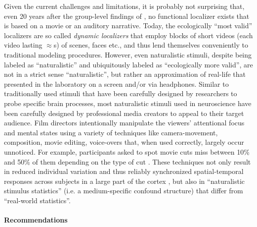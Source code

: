 %
Given the current challenges and limitations, it is probably not surprising
that, even 20 years after the group-level findings of
\citet{bartels2004mapping}, no functional localizer exists that is based on a
movie or an auditory narrative.
%
Today, the ecologically ``most valid'' localizers are so called \textit{dynamic
localizers} \citep{pitcher2011differential, fox2009defining} that employ blocks
of short videos (each video lasting $\approx$\unit[2-3]{s}) of scenes, faces
etc., and thus lend themselves conveniently to traditional modeling procedures.
%
However, even naturalistic stimuli, despite being labeled as ``naturalistic''
and ubiquitously labeled as ``ecologically more valid'', are not in a strict
sense ``naturalistic'', but rather an approximation of real-life that presented
in the laboratory on a screen and/or via headphones.
Similar to traditionally used stimuli that have been carefully designed by
researchers to probe specific brain processes, most naturalistic stimuli used in
neuroscience have been carefully designed by professional media creators to
appeal to their target audience.
%
Film directors intentionally manipulate the viewers' attentional focus and
mental states using a variety of techniques like camera-movement, composition,
movie editing, voice-overs \citep{brown2012cinematography,
dancyger2011film-technique, katz1991film, mercado2011filmmakers} that, when used
correctly, largely occur unnoticed.
%
For example, participants asked to spot movie cuts miss between 10\% and 50\% of
them depending on the type of cut \citep{smith2008edit}.
%
These techniques not only result in reduced individual variation and thus
reliably synchronized spatial-temporal responses across subjects in a large part
of the cortex \citep{hasson2008neurocinematics}, but also in ``naturalistic
stimulus statistics'' (i.e. a medium-specific confound structure) that differ
from ``real-world statistics''.


\paragraph{Recommendations}

